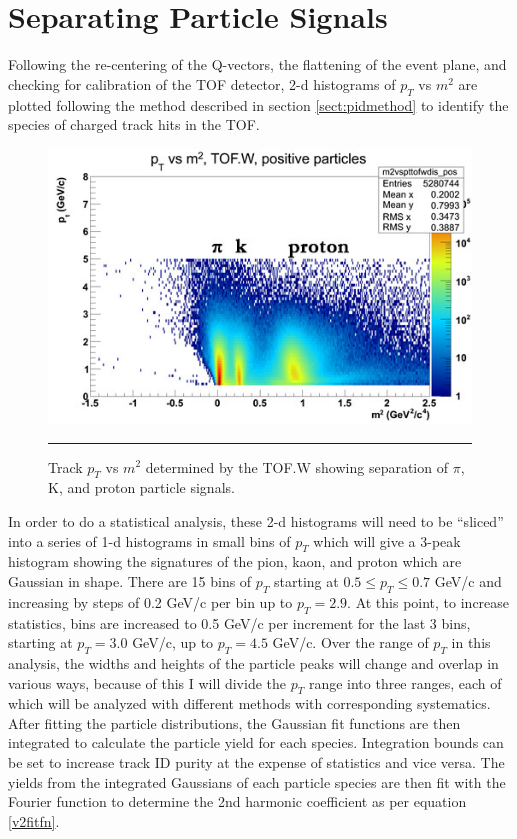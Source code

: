 \section{Separating Particle Signals}
Following the re-centering of the Q-vectors, the flattening of the event plane, and checking for calibration of the TOF detector, 2-d histograms of $p_T$ vs $m^2$ are plotted following the method described in section \ref{sect:pidmethod} to identify the species of charged track hits in the TOF. 
\begin{figure}[htbp!]
  \centering
    \includegraphics[width=1\textwidth]{Figures/ptvsm2tof.jpg}
    \rule{35em}{0.5pt}
  \caption[Track $p_T$ vs $m^2$ determined by the TOF.W showing separation of $\pi$, k, and proton particle signals.]{Track $p_T$ vs $m^2$ determined by the TOF.W showing separation of $\pi$, K, and proton particle signals.}
  \label{fig:accspread}
\end{figure}

In order to do a statistical analysis, these 2-d histograms will need to be ``sliced'' into a series of 1-d histograms in small bins of $p_T$ which will give a 3-peak histogram showing the signatures of the pion, kaon, and proton which are Gaussian in shape. There are 15 bins of $p_T$ starting at $0.5 \leq p_T \leq 0.7$ GeV/c and increasing by steps of 0.2 GeV/c per bin up to $p_T = 2.9$. At this point, to increase statistics, bins are increased to 0.5 GeV/c per increment for the last 3 bins, starting at $p_T = 3.0$ GeV/c, up to $p_T = 4.5 $ GeV/c. Over the range of $p_T$ in this analysis, the widths and heights of the particle peaks will change and overlap in various ways, because of this I will divide the $p_T$ range into three ranges, each of which will be analyzed with different methods with corresponding systematics. After fitting the particle distributions, the Gaussian fit functions are then integrated to calculate the particle yield for each species. Integration bounds can be set to increase track ID purity at the expense of statistics and vice versa. The yields from the integrated Gaussians of each particle species are then fit with the Fourier function to determine the 2nd harmonic coefficient as per equation \ref{v2fitfn}. 

